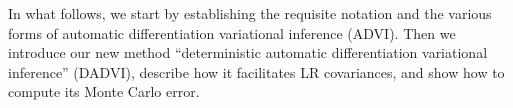 In what follows, we start by establishing the requisite notation and 
the various forms of automatic differentiation variational inference (ADVI).
Then we introduce our new method 
``deterministic automatic differentiation variational inference'' (DADVI),
describe how it facilitates LR
covariances, and show how to compute its Monte Carlo error.